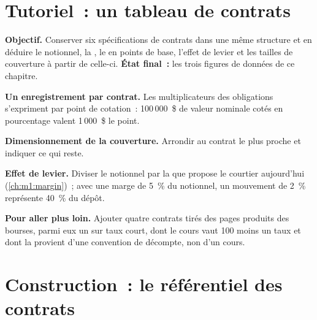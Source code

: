 \section{Tutoriel~: un tableau de contrats}\label{tut:m1:futures-contracts-and-exchanges:table}

\begin{tutorial}
\textbf{Objectif.} Conserver six spécifications de contrats dans une même structure et en déduire
le notionnel, la , le  en points de base, l'effet de levier et les tailles de
couverture à partir de celle-ci. \textbf{État final~:} les trois figures de données de ce chapitre.
\begin{tutsteps}
\item \textbf{Un enregistrement par contrat.} Les multiplicateurs des obligations s'expriment par
point de cotation~: 100\,000~\$ de valeur nominale cotés en pourcentage valent 1\,000~\$ le point.
\label{lst:m1:futures-contracts-and-exchanges:spec}
\item \textbf{Dimensionnement de la couverture.} Arrondir au contrat le plus proche et indiquer
ce qui reste.
\label{lst:m1:futures-contracts-and-exchanges:hedge}
\item \textbf{Effet de levier.} Diviser le notionnel par la  que propose le courtier
aujourd'hui (\cref{ch:m1:margin})~; avec une marge de 5~\% du notionnel, un mouvement de 2~\%
représente 40~\% du dépôt.
\end{tutsteps}
\textbf{Pour aller plus loin.} Ajouter quatre contrats tirés des pages produits des bourses,
parmi eux un  sur taux court, dont le cours vaut
100 moins un taux et dont la  provient d'une convention de décompte, non
d'un cours.
\end{tutorial}

\section{Construction~: le référentiel des contrats}\label{bld:m1:futures-contracts-and-exchanges:master}

